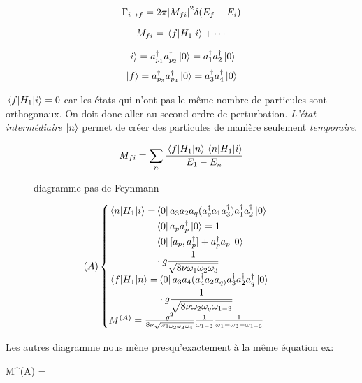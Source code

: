 $$\Gamma_{i\to f} = 2\pi \abs{M_{fi} }^{2} \delta(E_f -E_i ) $$ 


$$M_{fi} = \mel{f}{H_{1}}{i} + \dotsb$$ 

$$\ket{i} = a_{p_{1}}^{\dagger} a_{p_2} ^{\dagger} \ket{0}= a_1^{\dagger} a_2 ^{\dagger} \ket{0}$$ 
$$\ket{f}=  a^{\dagger}_{p_{3}} a_{p_4}^{\dagger} \ket{0} = a_3 ^{\dagger} a_4^{\dagger} \ket{0}$$ 

$\mel{f}{H_{1}}{i} =0$ car les états qui n'ont pas le même nombre de particules sont orthogonaux. On doit donc aller au second ordre de perturbation. \textit{L'état intermédiaire} $\ket{n}$ permet de créer des particules de manière seulement \textit{temporaire}.

$$M_{fi} = \sum_n \frac{\mel{f}{H_1}{n}\mel{n}{H_1}{i}}{E_1 -E_n} $$ 

\begin{figure}[ht]
    \centering
    \caption{diagramme pas de Feynmann}
    \label{fig:diagramme-pas-de-feynmann}
\end{figure}


$$(A)\begin{cases}
	\begin{align*}
		\mel{n}{H_{1}}{i} =& \bra{0} a_3 a_2 a_q (a^{\dagger}_q a_1 a_3 ^{\dagger}) a_1^{\dagger} a_2^{\dagger} \ket{0}\\
											& \bra{0} a_p a_p^{\dagger} \ket{0} =1\\ 
											& \bra{0} [a_p, a_p^{\dagger}] + a_p^{\dagger}a_p \ket{0}\\
											&\cdot g \frac{1}{\sqrt{8 \nu \omega_1 \omega_2 \omega_3} }
	\end{align*}\\
	\begin{align*}
		\mel{f}{H_{1}}{n} = &\bra{0}a_3 a_4 (a_4^{\dagger}a_2 a_{q)} a_3^{\dagger} a_2^{\dagger} a_q^{\dagger} \ket{0} \\
												&\cdot g \frac{1}{\sqrt{8\nu \omega_2 \omega_q \omega_{1-3} } }
	\end{align*}\\
	M^{(A)} = \frac{g^2}{8\nu \sqrt{\omega_{1\omega_2\omega_3\omega_4}}} \frac{1}{\omega_{1-3} } \frac{1}{\omega_1 -\omega_3 -\omega_{1-3} }  
\end{cases}$$ 


Les autres diagramme nous mène presqu'exactement à la même équation ex:


	M^{(A)} =     



